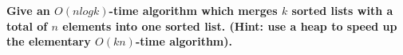 \textbf{Give an $O(n log k)$-time algorithm which merges $k$ sorted lists with a total of $n$ elements into one sorted list. (Hint: use a heap to speed up the elementary $O(kn)$-time algorithm).}\vspace{.2cm}

\textcolor{bibi}{}
\begin{quote}
\end{quote}